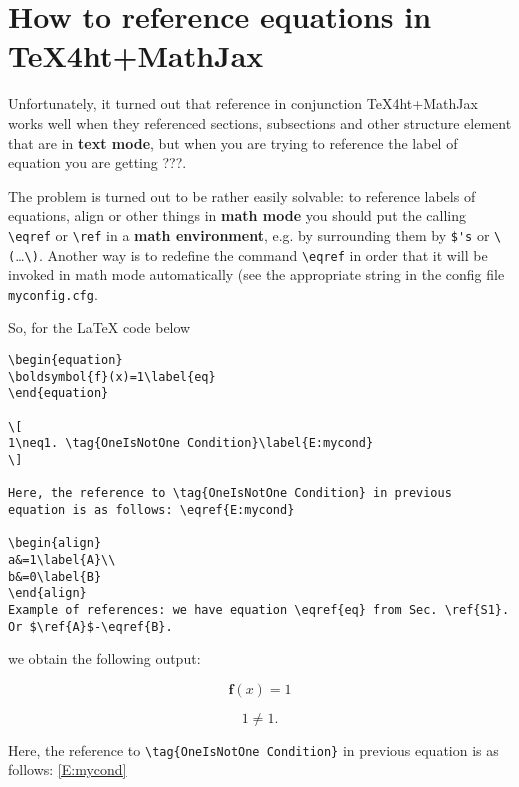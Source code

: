 \documentclass{article}
\begin{document}
      \section{How to reference equations in TeX4ht+MathJax}\label{S2}
      Unfortunately, it turned out that reference in conjunction
      TeX4ht+MathJax
      works well when they referenced sections, subsections and
      other structure
      element that are in \textbf{text mode}, but when you are
      trying to reference
      the label of equation you are getting ???.

      The problem is turned out to be rather easily solvable: to
      reference labels
      of equations, align or other things in \textbf{math mode} you
      should put the
      calling \verb|\eqref| or \verb|\ref| in a \textbf{math
      environment}, e.g. by
      surrounding them by \verb|$'s| or \verb|\(|\ldots\verb|\)|.
      Another way is to
      redefine the command \verb|\eqref| in order that it will be
      invoked in math
      mode automatically (see the appropriate string in the config file
        \verb|myconfig.cfg|.

        So, for the \LaTeX{} code below
        {\small
    \begin{verbatim}
\begin{equation}
\boldsymbol{f}(x)=1\label{eq}
\end{equation}

\[
1\neq1. \tag{OneIsNotOne Condition}\label{E:mycond}
\]

Here, the reference to \tag{OneIsNotOne Condition} in previous
equation is as follows: \eqref{E:mycond}

\begin{align}
a&=1\label{A}\\
b&=0\label{B}
\end{align}
Example of references: we have equation \eqref{eq} from Sec. \ref{S1}. Or $\ref{A}$-\eqref{B}.
\end{verbatim}}
          \noindent we obtain the following output:

          \begin{equation}
            \boldsymbol{f}(x)=1\label{eq}
          \end{equation}

          \[
            1\neq1. \tag{OneIsNotOne Condition}\label{E:mycond}
          \]

          Here, the reference to \verb|\tag{OneIsNotOne Condition}|
          in previous
          equation is as follows: \eqref{E:mycond}
\end{document}
